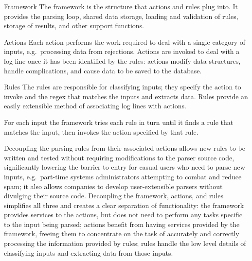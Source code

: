 \begin{eqlist}

    \item [Framework]  The framework is the structure that actions and
        rules plug into.  It provides the parsing loop, shared data
        storage, loading and validation of rules, storage of results, and
        other support functions.

    \item [Actions] Each action performs the work required to deal with a
        single category of inputs, e.g.\ processing data from rejections.
        Actions are invoked to deal with a log line once it has been
        identified by the rules: actions modify data structures, handle
        complications, and cause data to be saved to the database.

    \item [Rules]  The rules are responsible for classifying inputs; they
        specify the action to invoke and the regex that matches the inputs
        and extracts data.  Rules provide an easily extensible method of
        associating log lines with actions.

\end{eqlist}

For each input the framework tries each rule in turn until it finds a rule
that matches the input, then invokes the action specified by that rule.

\label{why separate rules, actions, and framework?}

Decoupling the parsing rules from their associated actions allows new rules
to be written and tested without requiring modifications to the parser
source code, significantly lowering the barrier to entry for casual users
who need to parse new inputs, e.g.\ part-time systems administrators
attempting to combat and reduce spam; it also allows companies to develop
user-extensible parsers without divulging their source code.  Decoupling
the framework, actions, and rules simplifies all three and creates a clear
separation of functionality: the framework provides services to the
actions, but does not need to perform any tasks specific to the input being
parsed; actions benefit from having services provided by the framework,
freeing them to concentrate on the task of accurately and correctly
processing the information provided by rules; rules handle the low level
details of classifying inputs and extracting data from those inputs.

